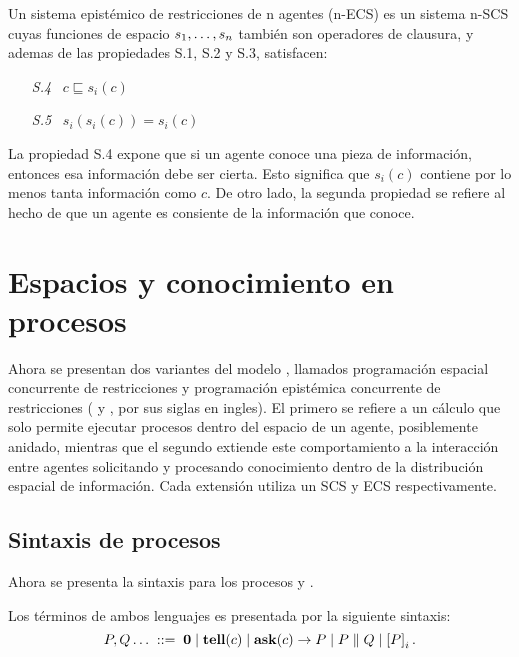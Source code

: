 \theoremstyle{definition}
\begin{definition}
Un sistema epist\'emico de restricciones de n agentes (n-ECS) es un sistema n-SCS cuyas funciones de espacio $s_1, \mathellipsis, s_n$ tambi\'en son operadores de clausura, y ademas de las propiedades S.1, S.2 y S.3, satisfacen:
\begin{enumerate} 
	\item [\it{S.4}] \ $c \sqsubseteq s_i(c)$
	\item [\it{S.5}] \ $s_i(s_i(c))=s_i(c)$
\end{enumerate}
\end{definition}

La propiedad S.4 expone que si un agente conoce una pieza de informaci\'on, entonces esa informaci\'on debe ser cierta. Esto significa que $s_i(c)$ contiene por lo menos tanta informaci\'on como $c$. De otro lado, la segunda propiedad se refiere al hecho de que un agente es consiente de la informaci\'on que conoce. 

\section{Espacios y conocimiento en procesos}
\label{ecp.sccp}

Ahora se presentan dos variantes del modelo \textbf{\CCP}, llamados programaci\'on espacial concurrente de restricciones y programaci\'on epist\'emica concurrente de restricciones (\textbf{\SCCP} y \textbf{\ECCP}, por sus siglas en ingles). El primero se refiere a un c\'alculo que solo permite ejecutar procesos dentro del espacio de un agente, posiblemente anidado, mientras que el segundo extiende este comportamiento a la interacci\'on entre agentes solicitando y procesando conocimiento dentro de la distribuci\'on espacial de informaci\'on. Cada extensi\'on utiliza un SCS y ECS respectivamente.

\subsection{Sintaxis de procesos}
\label{spr.cap3}

Ahora se presenta la sintaxis para los procesos \textbf{\SCCP} y \textbf{\ECCP}.

\theoremstyle{definition}
\begin{definition}
Los t\'erminos de ambos lenguajes es presentada por la siguiente sintaxis: \[P,Q\ldots \; ::= \;\Stop\mid \tell(c) \mid \ask(c)\rightarrow P \mid P \parallel Q  \mid \K i P.\]
\end{definition}

